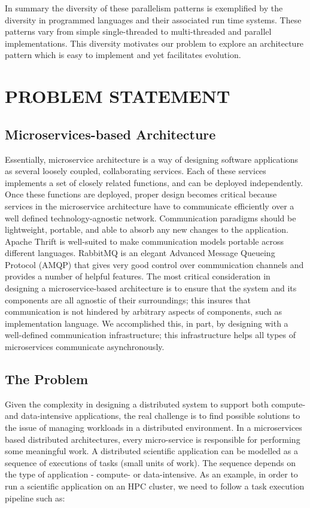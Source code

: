 \documentclass[sigconf]{acmart}
\begin{document}
In summary the diversity of these parallelism patterns is exemplified by the diversity in programmed languages and their associated run time systems. These patterns  vary from simple single-threaded to multi-threaded and parallel implementations. This diversity motivates our problem to explore an architecture pattern which is easy to implement and yet facilitates evolution.   

\section{PROBLEM STATEMENT}

\subsection{Microservices-based Architecture}
Essentially, microservice architecture is a way of designing software applications as several loosely coupled, collaborating services. Each of these services implements a set of closely related functions, and can be deployed independently. Once these functions are deployed, proper design becomes critical because services in the microservice architecture have to communicate efficiently over a well defined technology-agnostic network. Communication paradigms should be lightweight, portable, and able to absorb any new changes to the application. Apache Thrift is well-suited to make  communication models portable across different languages. RabbitMQ \cite{rabbitMQ} is an elegant Advanced Message Queueing Protocol (AMQP) that gives very good control over communication channels and provides a number of helpful features. The  most critical consideration in designing a microservice-based architecture is to ensure that the system and its components are all agnostic of their surroundings; this insures that communication is not hindered by arbitrary aspects of components, such as implementation language. We accomplished this, in part, by designing with a well-defined communication infrastructure; this infrastructure helps all types of microservices communicate asynchronously.

\subsection{The Problem}
Given the complexity in designing a distributed system to support both compute- and data-intensive applications, the real challenge is to find possible solutions to the issue of managing workloads in a distributed environment. In a microservices based distributed architectures, every micro-service is responsible for performing some meaningful work. A distributed scientific application can be modelled as a sequence of executions of tasks (small units of work). The sequence depends on the type of application - compute- or data-intensive. As an example, in order to run a scientific application on an HPC cluster, we need to follow a task execution pipeline such as:
\end{document}
